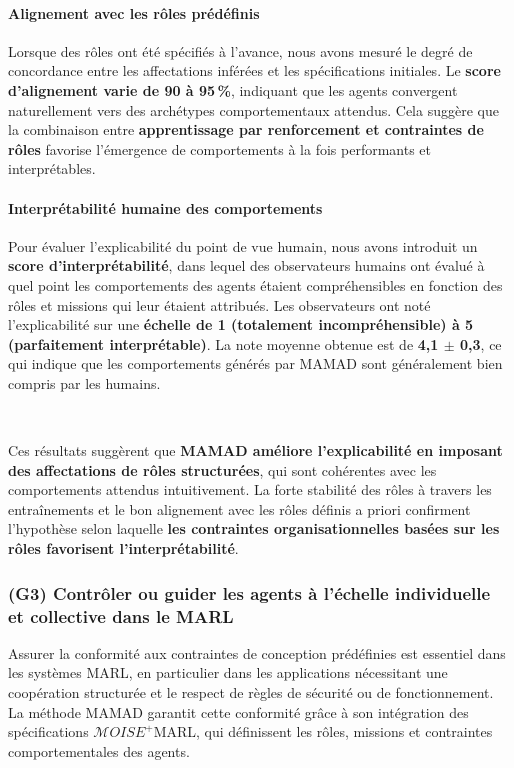\paragraph{Alignement avec les rôles prédéfinis}
Lorsque des rôles ont été spécifiés à l'avance, nous avons mesuré le degré de concordance entre les affectations inférées et les spécifications initiales. Le \textbf{score d'alignement varie de 90 à 95\,\%}, indiquant que les agents convergent naturellement vers des archétypes comportementaux attendus. Cela suggère que la combinaison entre \textbf{apprentissage par renforcement et contraintes de rôles} favorise l'émergence de comportements à la fois performants et interprétables.
\paragraph{Interprétabilité humaine des comportements}
Pour évaluer l'explicabilité du point de vue humain, nous avons introduit un \textbf{score d'interprétabilité}, dans lequel des observateurs humains ont évalué à quel point les comportements des agents étaient compréhensibles en fonction des rôles et missions qui leur étaient attribués. Les observateurs ont noté l'explicabilité sur une \textbf{échelle de 1 (totalement incompréhensible) à 5 (parfaitement interprétable)}. La note moyenne obtenue est de \textbf{4{,}1 $\pm$ 0{,}3}, ce qui indique que les comportements générés par MAMAD sont généralement bien compris par les humains.

\

Ces résultats suggèrent que \textbf{MAMAD améliore l'explicabilité en imposant des affectations de rôles structurées}, qui sont cohérentes avec les comportements attendus intuitivement. La forte stabilité des rôles à travers les entraînements et le bon alignement avec les rôles définis a priori confirment l'hypothèse selon laquelle \textbf{les contraintes organisationnelles basées sur les rôles favorisent l'interprétabilité}.


\subsubsection{(G3) Contrôler ou guider les agents à l'échelle individuelle et collective dans le MARL}

Assurer la conformité aux contraintes de conception prédéfinies est essentiel dans les systèmes MARL, en particulier dans les applications nécessitant une coopération structurée et le respect de règles de sécurité ou de fonctionnement. La méthode MAMAD garantit cette conformité grâce à son intégration des spécifications $\mathcal{M}OISE^+$MARL, qui définissent les rôles, missions et contraintes comportementales des agents.

